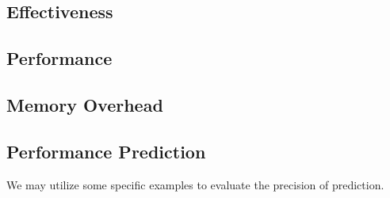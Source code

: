 \label{sec:eval}

\subsection{Effectiveness}

\subsection{Performance}

\subsection{Memory Overhead}

\subsection{Performance Prediction}
\label{sec:evalperfpred}

We may utilize some specific examples to evaluate the precision of prediction. 